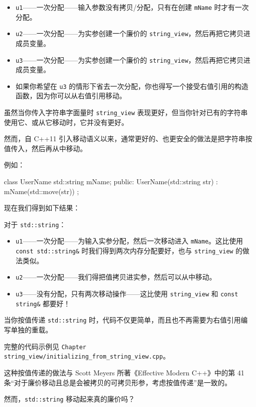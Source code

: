 \begin{itemize}
\item \texttt{u1}——一次分配——输入参数没有拷贝/分配，只有在创建 \texttt{mName} 时才有一次分配。
\item \texttt{u2}——一次分配——为实参创建一个廉价的 \texttt{string\_view}，然后再把它拷贝进成员变量。
\item \texttt{u3}——一次分配——为实参创建一个廉价的 \texttt{string\_view}，然后再把它拷贝进成员变量。
\item 如果你希望在 \texttt{u3} 的情形下省去一次分配，你也得写一个接受右值引用的构造函数，因为你可以从右值引用移动。
\end{itemize}

虽然当你传入字符串字面量时 \texttt{string\_view} 表现更好，但当你针对已有的字符串使用它、或从它移动时，它并没有更好。

然而，自 C++11 引入移动语义以来，通常更好的、也更安全的做法是把字符串按值传入，然后再从中移动。

例如：

\begin{codebox}[cpp]
class UserName {
std::string mName;
public:
UserName(std::string str) : mName(std::move(str)) { }
};
\end{codebox}

现在我们得到如下结果：

对于 \texttt{std::string}：

\begin{itemize}
\item \texttt{u1}——一次分配——为输入实参分配，然后一次移动进入 \texttt{mName}。这比使用 \texttt{const std::string\&} 时我们得到两次内存分配要好，也与 \texttt{string\_view} 的做法类似。
\item \texttt{u2}——一次分配——我们得把值拷贝进实参，然后可以从中移动。
\item \texttt{u3}——没有分配，只有两次移动操作——这比使用 \texttt{string\_view} 和 \texttt{const string\&} 都要好！
\end{itemize}

当你按值传递 \texttt{std::string} 时，代码不仅更简单，而且也不再需要为右值引用编写单独的重载。

完整的代码示例见 \texttt{Chapter string\_view/initializing\_from\_string\_view.cpp}。

这种按值传递的做法与 Scott Meyers 所著《Effective Modern C++》中的第 41 条“对于廉价移动且总是会被拷贝的可拷贝形参，考虑按值传递”是一致的。

然而，\texttt{std::string} 移动起来真的廉价吗？

